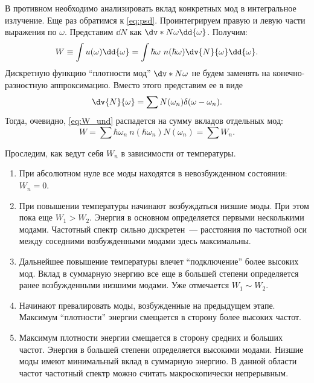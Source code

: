     В противном необходимо анализировать вклад конкретных мод в интегральное излучение. Еще раз обратимся к \autoref{eq:psd}. Проинтегрируем правую и левую части выражения по $\omega$. Представим $\dd{N}$ как $\dv*{N}{\omega}\dd{\omega}$. Получим:
    \begin{equation}\label{eq:W_und}
        W \equiv \int u(\omega) \dd{\omega} =
            \int \hbar\omega\ n(\hbar\omega) \dv{N}{\omega}\dd{\omega} .
    \end{equation}
    Дискретную функцию \enquote{плотности мод} $\dv*{N}{\omega}$ не будем заменять на конечно-разностную аппроксимацию. Вместо этого представим ее в виде
    \begin{equation}
        \dv{N}{\omega} = \sum N(\omega_n) \delta(\omega - \omega_n) .
    \end{equation}
    Тогда, очевидно, \autoref{eq:W_und} распадется на сумму вкладов отдельных мод:
    \begin{equation}\label{eq:W}
        W = \sum \hbar\omega_n\ n(\hbar\omega_n) N(\omega_n)
          = \sum W_n .
    \end{equation}

    Проследим, как ведут себя $W_n$ в зависимости от температуры.
    \begin{enumerate}[nosep]
        \item При абсолютном нуле все моды находятся в невозбужденном состоянии: $W_n = 0$.

        \item При повышении температуры начинают возбуждаться низшие моды. При этом пока еще $W_1 > W_2$. Энергия в основном определяется первыми несколькими модами. Частотный спектр сильно дискретен~--- расстояния по частотной оси между соседними возбужденными модами здесь максимальны.

        \item Дальнейшее повышение температуры влечет \enquote{подключение} более высоких мод. Вклад в суммарную энергию все еще в большей степени определяется ранее возбужденными низшими модами. Уже отмечается $W_1 \sim W_2$.

        \item Начинают превалировать моды, возбужденные на предыдущем этапе. Максимум \enquote{плотности} энергии смещается в сторону более высоких частот.

        \item Максимум плотности энергии смещается в сторону средних и больших частот. Энергия в большей степени определяется высокими модами. Низшие моды имеют минимальный вклад в суммарную энергию. В данной области частот частотный спектр можно считать макроскопически непрерывным.
    \end{enumerate}

